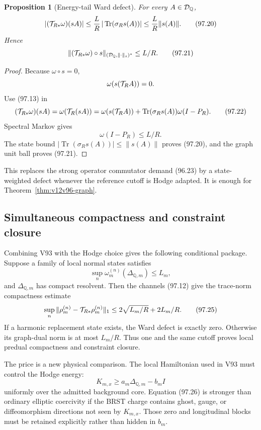 \documentclass[11pt]{article}
\newtheorem{proposition}[theorem]{Proposition}
\theoremstyle{remark}
\begin{document}
\begin{proposition}[Energy-tail Ward defect]
\label{prop:v12v97-tail}
For every \(A\in{\cal D}_{\mathbb Q}\),
\[
 |({\cal T}_{R*}\omega)(sA)|
 \leq\frac{L}{R}\,
       |\operatorname{Tr}(\sigma_Rs(A))|
 \leq\frac{L}{R}\|s(A)\|.                                      \tag{97.20}
\]
Hence
\[
 \|({\cal T}_{R*}\omega)\circ s\|_{
       ({\cal D}_{\mathbb Q},\|\cdot\|_s)^*}
 \leq L/R.                                                      \tag{97.21}
\]
\end{proposition}

\begin{proof}
Because \(\omega\circ s=0\),
\[
 \omega(s({\cal T}_RA))=0.
\]
Use (97.13) in
\[
 ({\cal T}_{R*}\omega)(sA)
 =\omega({\cal T}_R(sA))
 =\omega(s({\cal T}_RA))
  +\operatorname{Tr}(\sigma_Rs(A))\omega(I-P_R).                 \tag{97.22}
\]
Spectral Markov gives
\[
 \omega(I-P_R)\leq L/R.                                        \tag{97.23}
\]
The state bound
\(|\operatorname{Tr}(\sigma_Rs(A))|\leq\|s(A)\|\)
proves (97.20), and the graph unit ball proves (97.21).
\end{proof}

This replaces the strong operator commutator demand (96.23) by a
state-weighted defect whenever the reference cutoff is Hodge
adapted.  It is enough for Theorem~\ref{thm:v12v96-graph}.

\subsection{Simultaneous compactness and constraint closure}

Combining V93 with the Hodge choice gives the following conditional
package.  Suppose a family of local normal states satisfies
\[
 \sup_n\omega_m^{(n)}(\Delta_{{\mathbb Q},m})\leq L_m,            \tag{97.24}
\]
and \(\Delta_{{\mathbb Q},m}\) has compact resolvent.  Then the
channels (97.12) give the trace-norm compactness estimate
\[
 \sup_n\|\rho_m^{(n)}
       -{\cal T}_{R*}\rho_m^{(n)}\|_1
 \leq2\sqrt{L_m/R}+2L_m/R.                                     \tag{97.25}
\]
If a harmonic replacement state exists, the Ward defect is exactly
zero.  Otherwise its graph-dual norm is at most \(L_m/R\).
Thus one and the same cutoff proves local predual compactness and
constraint closure.

The price is a new physical comparison.  The local Hamiltonian used
in V93 must control the Hodge energy:
\[
 K_{m,x}\geq a_m\Delta_{{\mathbb Q},m}-b_mI                     \tag{97.26}
\]
uniformly over the admitted background core.  Equation (97.26) is
stronger than ordinary elliptic coercivity if the BRST charge
contains ghost, gauge, or diffeomorphism directions not seen by
\(K_{m,x}\).  Those zero and longitudinal blocks must be retained
explicitly rather than hidden in \(b_m\).
\end{document}
